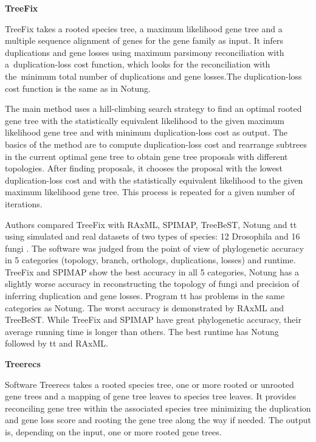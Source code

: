 \noindent \textbf{TreeFix}  

TreeFix \cite{treefix_tutorial} takes a rooted species tree, a maximum likelihood gene tree and a multiple sequence alignment of genes for the gene family as input. It infers duplications and gene losses using maximum parsimony reconciliation with a~duplication-loss cost function, which looks for the reconciliation with the~minimum total number of duplications and gene losses.The duplication-loss cost function is the same as in Notung.

The main method \cite{treefix} uses a hill-climbing search strategy to find an optimal rooted gene tree with the statistically equivalent likelihood to the given maximum likelihood gene tree and with minimum duplication-loss cost as output. The basics of the method are to compute duplication-loss cost and rearrange subtrees in the current optimal gene tree to obtain gene tree proposals with different topologies. After finding proposals, it chooses the proposal with the lowest duplication-loss cost and with the statistically equivalent likelihood to the given maximum likelihood gene tree. This process is repeated for a given number of iterations.

Authors compared TreeFix with RAxML, SPIMAP, TreeBeST, Notung and tt using simulated and real datasets of two types of species: 12 Drosophila and 16 fungi \cite{treefix_online}. The software was judged from the point of view of phylogenetic accuracy in 5 categories (topology, branch, orthologs, duplications, losses) and runtime. TreeFix and SPIMAP show the best accuracy in all 5 categories, Notung has a slightly worse accuracy in reconstructing the topology of fungi and precision of inferring duplication and gene losses. Program tt has problems in the same categories as Notung. The worst accuracy is demonstrated by RAxML and TreeBeST. While TreeFix and SPIMAP have great phylogenetic accuracy, their average running time is longer than others. The best runtime has Notung followed by tt and RAxML.

\noindent\textbf{Treerecs} 

Software Treerecs \cite{treerecs_tutorial} takes a rooted species tree, one or more rooted or unrooted gene trees and a mapping of gene tree leaves to species tree leaves. It provides reconciling gene tree within the associated species tree minimizing the duplication and gene loss score and rooting the gene tree along the way if needed. The output is, depending on the input, one or more rooted gene trees.

